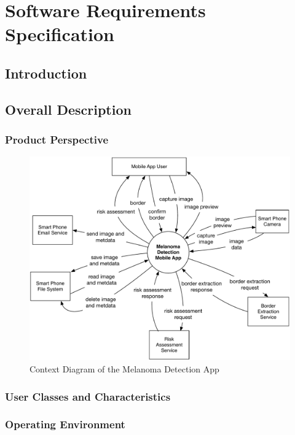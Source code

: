 \section{Software Requirements Specification}

    \subsection{Introduction}

    \subsection{Overall Description}

        \subsubsection{Product Perspective}


            \begin{figure}[H]
                \centering
                \includegraphics[width=\textwidth]{assets/requirements/ContextDiagram.pdf}
                \caption{Context Diagram of the Melanoma Detection App}
                \label{fig:partial_feature_tree}
            \end{figure}


        \subsubsection{User Classes and Characteristics}
        \subsubsection{Operating Environment}
